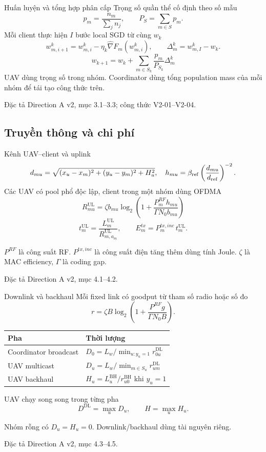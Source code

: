 \documentclass[10pt,aspectratio=43]{beamer}
\newcommand{\src}[1]{\par\vfill{\fontsize{6}{7.2}\selectfont\color{Muted}
 Đặc tả Direction A v2, mục #1.\par}}
\newcommand{\smallnote}[1]{\par{\footnotesize\color{Muted}#1\par}}
\newcommand{\UL}{\mathrm{UL}}
\newcommand{\DL}{\mathrm{DL}}
\newcommand{\BH}{\mathrm{BH}}
\begin{document}
\begin{frame}[t]{Huấn luyện và tổng hợp phân cấp}
\relax
Trọng số quần thể cố định theo số mẫu
\[
p_m=\frac{n_m}{\sum_j n_j},\qquad
P_S=\sum_{m\in S}p_m.
\]
Mỗi client thực hiện $I$ bước local SGD từ cùng $w_k$
\[
w_{m,i+1}^k=w_{m,i}^k-\eta_k\widehat\nabla F_m(w_{m,i}^k),
\qquad \Delta_m^k=w_{m,I}^k-w_k.
\]
\[
\boxed{\displaystyle
w_{k+1}=w_k+\sum_{m\in S_k}\frac{p_m}{P_{S_k}}\Delta_m^k}
\]
UAV dùng trọng số trong nhóm. Coordinator dùng tổng population mass của mỗi nhóm để tái tạo công thức trên.
\src{3.1--3.3; công thức V2-01--V2-04}
\end{frame}

\subsection{Truyền thông và chi phí}
\begin{frame}[t]{Kênh UAV--client và uplink}
\relax
\[
d_{mu}=\sqrt{(x_u-x_m)^2+(y_u-y_m)^2+H_u^2},
\quad
h_{mu}=\beta_{\rm ref}\left(\frac{d_{mu}}{d_{\rm ref}}\right)^{-2}.
\]
Các UAV có pool phổ độc lập, client trong một nhóm dùng OFDMA
\[
\boxed{\displaystyle
R_{mu}^{\UL}=\zeta b_{mu}
\log_2\left(1+\frac{P_m^{RF}h_{mu}}{\Gamma N_0b_{mu}}\right)}
\]
\[
t_m^{\UL}=\frac{L_m^{\UL}}{R_{m,a_m}^{\UL}},
\qquad E_m^{tx}=P_m^{tx,inc}\,t_m^{\UL}.
\]
\smallnote{$P^{RF}$ là công suất RF. $P^{tx,inc}$ là công suất điện tăng thêm dùng tính Joule. $\zeta$ là MAC efficiency, $\Gamma$ là coding gap.}
\src{4.1--4.2}
\end{frame}

\begin{frame}[t]{Downlink và backhaul}
\relax
Mỗi fixed link có goodput từ tham số radio hoặc số đo
\[
r=\zeta B\log_2\left(1+\frac{P^{RF}g}{\Gamma N_0B}\right).
\]
\renewcommand{\arraystretch}{1.5}
\begin{tabularx}{.99\textwidth}{@{}lY@{}}
\toprule
\textbf{Pha} & \textbf{Thời lượng}\\
\midrule
Coordinator broadcast & $D_0=L_w/\min_{u:y_u=1}r_{0u}^{\DL}$\\
UAV multicast & $D_u=L_w/\min_{m\in S_u}r_{um}^{\DL}$\\
UAV backhaul & $H_u=L_u^{\BH}/r_{u0}^{\BH}$ khi $y_u=1$\\
\bottomrule
\end{tabularx}\par
\medskip
UAV chạy song song trong từng pha
\[
D^{\DL}=\max_u D_u,\qquad H=\max_u H_u.
\]
\smallnote{Nhóm rỗng có $D_u=H_u=0$. Downlink/backhaul dùng tài nguyên riêng.}
\src{4.3--4.5}
\end{frame}
\end{document}
